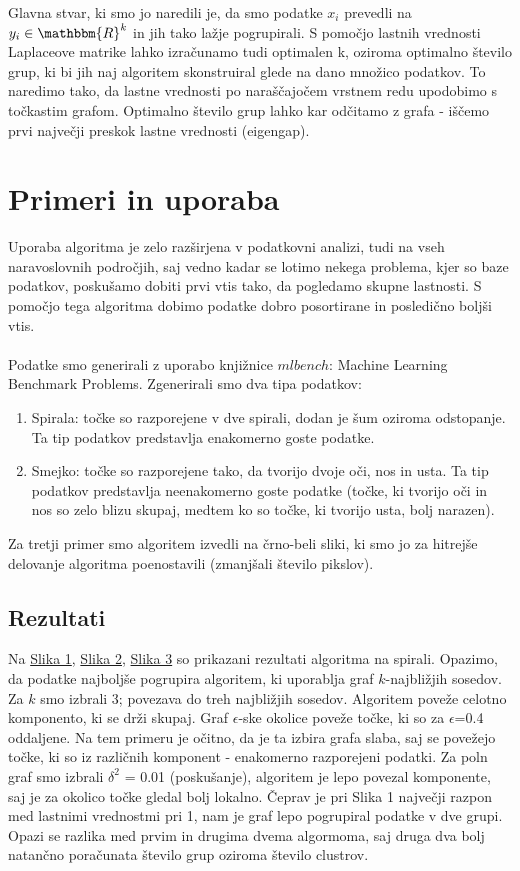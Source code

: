 \documentclass[a4paper, 10pt]{article}
\begin{document}
Glavna stvar, ki smo jo naredili je, da smo podatke $x_i$ prevedli na $y_i\in \mathbbm{R}^{k}$ in jih tako lažje pogrupirali. S pomočjo lastnih vrednosti Laplaceove matrike lahko izračunamo tudi optimalen k, oziroma optimalno število grup, ki bi jih naj algoritem skonstruiral glede na dano množico podatkov. To naredimo tako, da lastne vrednosti po naraščajočem vrstnem redu upodobimo s točkastim grafom. Optimalno število grup lahko kar odčitamo z grafa - iščemo prvi največji preskok lastne vrednosti (eigengap).
\pagebreak 
\section{Primeri in uporaba}

Uporaba algoritma je zelo razširjena v podatkovni analizi, tudi na vseh naravoslovnih
področjih, saj vedno kadar se lotimo nekega problema, kjer so baze
podatkov, poskušamo dobiti prvi vtis tako, da pogledamo skupne lastnosti. S
pomočjo tega algoritma dobimo podatke dobro posortirane in posledično boljši
vtis.\\
\\
Podatke smo generirali z uporabo knjižnice $mlbench$: Machine Learning Benchmark Problems. Zgenerirali smo dva tipa podatkov:
\begin{enumerate}
\item Spirala: točke so razporejene v dve spirali, dodan je šum oziroma odstopanje. Ta tip podatkov predstavlja enakomerno goste podatke.
\item Smejko: točke so razporejene tako, da tvorijo dvoje oči, nos in usta. Ta tip podatkov predstavlja neenakomerno goste podatke (točke, ki tvorijo oči in nos so zelo blizu skupaj, medtem ko so točke, ki tvorijo usta, bolj narazen).
\end{enumerate}
Za tretji primer smo algoritem izvedli na črno-beli sliki, ki smo jo za hitrejše delovanje algoritma poenostavili (zmanjšali število pikslov). 

\subsection{Rezultati}

Na \underline{Slika 1}, \underline{Slika 2}, \underline{Slika 3} so prikazani rezultati algoritma na spirali. Opazimo, da podatke najboljše pogrupira algoritem, ki uporablja graf $k$-najbližjih sosedov. Za $k$ smo izbrali 3; povezava do treh najbližjih sosedov. Algoritem poveže celotno komponento, ki se drži skupaj. Graf $\epsilon$-ske okolice poveže točke, ki so za $\epsilon$=0.4 oddaljene. Na tem primeru je očitno, da je ta izbira grafa slaba, saj se povežejo točke, ki so iz različnih komponent - enakomerno razporejeni podatki. Za poln graf smo izbrali $\delta^2$ = 0.01 (poskušanje), algoritem je lepo povezal komponente, saj je za okolico točke gledal bolj lokalno. Čeprav je pri Slika 1 največji razpon med lastnimi vrednostmi pri 1, nam je graf lepo pogrupiral podatke v dve grupi. Opazi se razlika med prvim in drugima dvema algormoma, saj druga dva bolj natančno poračunata število grup oziroma število clustrov.
\end{document}
